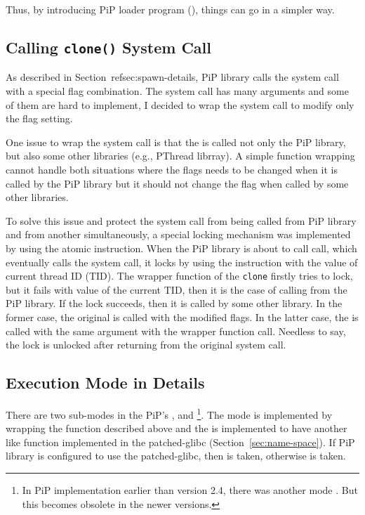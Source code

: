 Thus, by introducing PiP loader program (), things
can go in a simpler way. 


\subsection{Calling {\tt clone()} System Call}\label{sec:clone}

As described in Section~ref{sec:spawn-details}, PiP library calls the
 system call with a special flag combination. The
 system call has many arguments and some of them
are hard to implement, I decided to wrap the 
system call to modify only the flag setting.

One issue to wrap the  system call is that the
 is called not only the PiP library, but also some
other libraries (e.g., PThread librray). A simple function wrapping
cannot handle both situations where the flags needs to be changed when
it is called by the PiP library but it should not change the flag when
called by some other libraries.

To solve this issue and protect the  system call from
being called from PiP library and from another simultaneously, a
special locking mechanism was implemented by using the
{\tt{}} atomic instruction. When the PiP library is about
to call  call, which eventually calls the
 system call, it locks by using the {\tt{}}
instruction with the value of current thread ID (TID). The wrapper
function of the {\tt clone} firstly tries to lock, but it fails with
value of the current TID, then it is the case of calling from the PiP
library. If the lock succeeds, then it is called by some other
library. In the former case, the original  is called with
the modified flags. In the latter case, the  is called
with the same argument with the wrapper function call. Needless to say,
the lock is unlocked after returning from the original 
system call.

\subsection{Execution Mode in Details}

There are two sub-modes in the PiP's ,
 and \footnote{In
PiP implementation earlier than version 2.4, there was another mode
. But this becomes obsolete in the newer
versions.}. The  mode is implemented by
wrapping the  function described above and the
is implemented to have another  like function
implemented in the patched-glibc (Section~\ref{sec:name-space}). If
  PiP library is configured to use the patched-glibc, then
   is taken, otherwise 
  is taken. 

